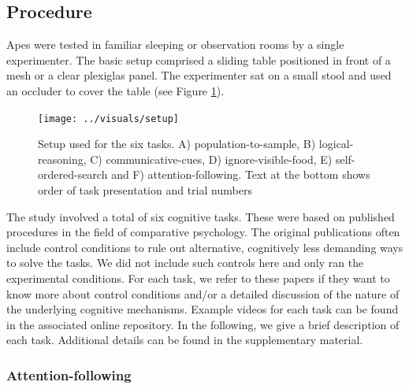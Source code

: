 \documentclass[
  man,floatsintext]{apa6}
\begin{document}
\hypertarget{procedure}{%
\subsection{Procedure}\label{procedure}}

Apes were tested in familiar sleeping or observation rooms by a single experimenter. The basic setup comprised a sliding table positioned in front of a mesh or a clear plexiglas panel. The experimenter sat on a small stool and used an occluder to cover the table (see Figure \ref{fig:setup}).

\begin{figure}
\texttt{[image: ../visuals/setup]} \caption{Setup used for the six tasks. A) population-to-sample, B) logical-reasoning, C) communicative-cues, D) ignore-visible-food, E) self-ordered-search and F) attention-following. Text at the bottom shows order of task presentation and trial numbers}\label{fig:setup}
\end{figure}

The study involved a total of six cognitive tasks. These were based on published procedures in the field of comparative psychology. The original publications often include control conditions to rule out alternative, cognitively less demanding ways to solve the tasks. We did not include such controls here and only ran the experimental conditions. For each task, we refer to these papers if they want to know more about control conditions and/or a detailed discussion of the nature of the underlying cognitive mechanisms. Example videos for each task can be found in the associated online repository. In the following, we give a brief description of each task. Additional details can be found in the supplementary material.

\hypertarget{attention-following}{%
\subsubsection{Attention-following}\label{attention-following}}
\end{document}
